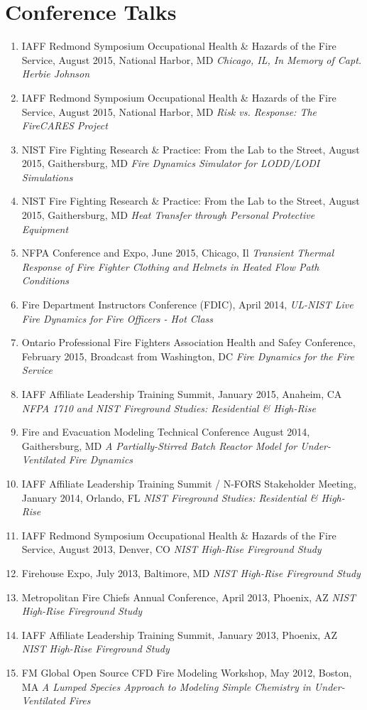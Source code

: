 \documentclass[10pt,letterpaper]{article}
\begin{document}
\section*{Conference Talks}
\begin{enumerate}
\item IAFF Redmond Symposium Occupational Health \& Hazards of the Fire Service, August 2015, National Harbor, MD {\em Chicago, IL, In Memory of Capt. Herbie Johnson}
\item IAFF Redmond Symposium Occupational Health \& Hazards of the Fire Service, August 2015, National Harbor, MD {\em Risk vs. Response: The FireCARES Project}
\item NIST Fire Fighting Research \& Practice: From the Lab to the Street, August 2015, Gaithersburg, MD {\em Fire Dynamics Simulator for LODD/LODI Simulations}
\item NIST Fire Fighting Research \& Practice: From the Lab to the Street, August 2015, Gaithersburg, MD {\em Heat Transfer through Personal Protective Equipment}
\item NFPA Conference and Expo, June 2015, Chicago, Il {\em Transient Thermal Response of Fire Fighter Clothing and Helmets in Heated Flow Path Conditions}
\item Fire Department Instructors Conference (FDIC), April 2014, {\em UL-NIST Live Fire Dynamics for Fire Officers - Hot Class}
\item Ontario Professional Fire Fighters Association Health and Safey Conference, February 2015, Broadcast from Washington, DC {\em Fire Dynamics for the Fire Service}
\item IAFF Affiliate Leadership Training Summit, January 2015, Anaheim, CA {\em NFPA 1710 and NIST Fireground Studies: Residential \& High-Rise}
\item Fire and Evacuation Modeling Technical Conference August 2014, Gaithersburg, MD {\em A Partially-Stirred Batch Reactor Model for Under-Ventilated Fire Dynamics}
\item IAFF Affiliate Leadership Training Summit / N-FORS Stakeholder Meeting, January 2014, Orlando, FL {\em NIST Fireground Studies: Residential \& High-Rise}
\item IAFF Redmond Symposium Occupational Health \& Hazards of the Fire Service, August 2013, Denver, CO {\em NIST High-Rise Fireground Study}
\item Firehouse Expo, July 2013, Baltimore, MD {\em NIST High-Rise Fireground Study}
\item Metropolitan Fire Chiefs Annual Conference, April 2013, Phoenix, AZ {\em NIST High-Rise Fireground Study}
\item IAFF Affiliate Leadership Training Summit, January 2013, Phoenix, AZ {\em NIST High-Rise Fireground Study}
\item FM Global Open Source CFD Fire Modeling Workshop, May 2012, Boston, MA {\em A Lumped Species Approach to Modeling Simple Chemistry in Under-Ventilated Fires}
\end{enumerate}
\end{document}
